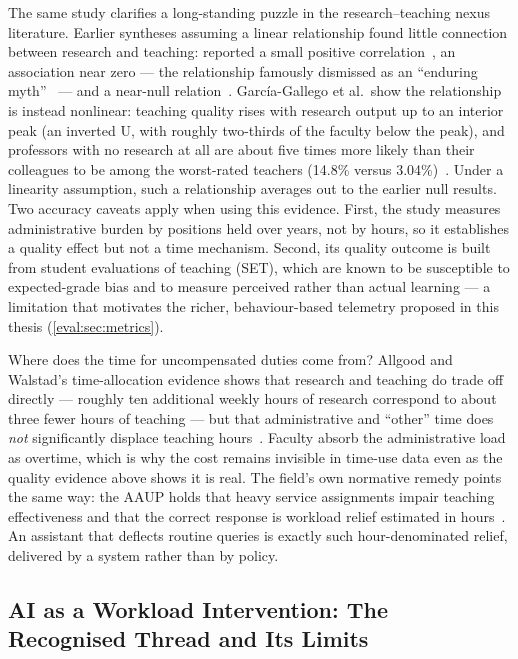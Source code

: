 The same study clarifies a long-standing puzzle in the research--teaching
nexus literature. Earlier syntheses assuming a linear relationship found
little connection between research and teaching: \citet{rhe87:Feldman} reported a small
positive correlation~\cite{rhe87:Feldman}, \citet{rer96:Hattie} an association
near zero --- the relationship famously dismissed as an \enquote{enduring
myth}~\cite{rer96:Hattie} --- and \citet{jhe02:Marsh} a near-null
relation~\cite{jhe02:Marsh}. García-Gallego et al.\ show the relationship is
instead nonlinear: teaching quality rises with research output up to an
interior peak (an inverted U, with roughly two-thirds of the faculty below the
peak), and professors with no research at all are about five times more likely
than their colleagues to be among the worst-rated teachers (14.8\% versus
3.04\%)~\cite{apec15:GarciaGallego}. Under a linearity assumption, such a
relationship averages out to the earlier null results. Two accuracy caveats
apply when using this evidence. First, the study measures administrative
burden by positions held over years, not by hours, so it establishes a quality
effect but not a time mechanism. Second, its quality outcome is built from
student evaluations of teaching (SET), which are known to be susceptible to
expected-grade bias and to measure perceived rather than actual learning ---
a limitation that motivates the richer, behaviour-based telemetry proposed in
this thesis (\autoref{eval:sec:metrics}).

Where does the time for uncompensated duties come from? Allgood and Walstad's
time-allocation evidence shows that research and teaching do trade off
directly --- roughly ten additional weekly hours of research correspond to
about three fewer hours of teaching --- but that administrative and
\enquote{other} time does \emph{not} significantly displace teaching
hours~\cite{wp07:Allgood, aer13:Allgood}. Faculty absorb the administrative
load as overtime, which is why the cost remains invisible in time-use data
even as the quality evidence above shows it is real. The field's own normative
remedy points the same way: the AAUP holds that heavy service assignments
impair teaching effectiveness and that the correct response is workload relief
estimated in hours~\cite{aaup00:Workload}. An assistant that deflects routine
queries is exactly such hour-denominated relief, delivered by a system rather
than by policy.

\subsection{AI as a Workload Intervention: The Recognised Thread and Its
            Limits}
\label{review:subsec:ai}

